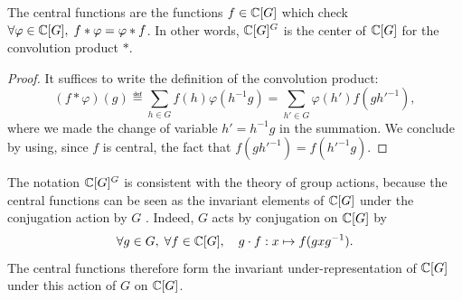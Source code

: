 \begin{prop}
The central functions are the functions $ f \in \mathbb{C} [G] $ which check $ \forall \varphi \in \mathbb{C} [G], \; f * \varphi = \varphi * f $. In other words, $ \mathbb{C} [G]^G $ is the center of $ \mathbb{C} [G] $ for the convolution product $ * $.
\end{prop}
\begin{proof}
It suffices to write the definition of the convolution product:
\begin{equation*}
(f * \varphi) (g) \eqdef \sum_{h \in G}{f(h) \varphi (h^{-1} g)} = \sum_{h'\in G}{\varphi ( h') f(g h'^{-1})},
\end{equation*}
where we made the change of variable $ h'= h^{-1} g $ in the summation. We conclude by using, since $ f $ is central, the fact that $ f(g h'^{-1}) = f(h'^{-1} g) $.
\end{proof}
 
 
\begin{rem}
The notation $ \mathbb{C} [G]^G $ is consistent with the theory of group actions, because the central functions can be seen as the invariant elements of $ \mathbb{C} [G] $ under the conjugation action by $G$ . Indeed, $G$ acts by conjugation on $ \mathbb{C} [G] $ by
\begin{equation*}
\forall g \in G, \; \forall f \in \mathbb{C} [G], \quad g \cdot f: x \mapsto f(gxg^{-1}).
\end{equation*}
The central functions therefore form the invariant under-representation of $ \mathbb{C} [G] $ under this action of $G$ on $ \mathbb{C} [G] $.
\end{rem}
 
